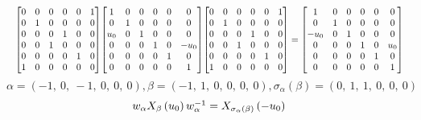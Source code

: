 \documentclass[11pt]{article}
\theoremstyle{definition}
\begin{document}
\[
\scaletoalign{\textwidth}{{\left[\begin{matrix}0 & 0 & 0 & 0 & 0 & 1\\0 & 1 & 0 & 0 & 0 & 0\\0 & 0 & 0 & 1 & 0 & 0\\0 & 0 & 1 & 0 & 0 & 0\\0 & 0 & 0 & 0 & 1 & 0\\1 & 0 & 0 & 0 & 0 & 0\end{matrix}\right]} {\left[\begin{matrix}1 & 0 & 0 & 0 & 0 & 0\\0 & 1 & 0 & 0 & 0 & 0\\u_{0} & 0 & 1 & 0 & 0 & 0\\0 & 0 & 0 & 1 & 0 & - u_{0}\\0 & 0 & 0 & 0 & 1 & 0\\0 & 0 & 0 & 0 & 0 & 1\end{matrix}\right]} {\left[\begin{matrix}0 & 0 & 0 & 0 & 0 & 1\\0 & 1 & 0 & 0 & 0 & 0\\0 & 0 & 0 & 1 & 0 & 0\\0 & 0 & 1 & 0 & 0 & 0\\0 & 0 & 0 & 0 & 1 & 0\\1 & 0 & 0 & 0 & 0 & 0\end{matrix}\right]} = {\left[\begin{matrix}1 & 0 & 0 & 0 & 0 & 0\\0 & 1 & 0 & 0 & 0 & 0\\- u_{0} & 0 & 1 & 0 & 0 & 0\\0 & 0 & 0 & 1 & 0 & u_{0}\\0 & 0 & 0 & 0 & 1 & 0\\0 & 0 & 0 & 0 & 0 & 1\end{matrix}\right]}}
\]
\[
\alpha = \left( -1, \  0, \  -1, \  0, \  0, \  0\right), \beta = \left( -1, \  1, \  0, \  0, \  0, \  0\right), \sigma_{\alpha}(\beta) = \left( 0, \  1, \  1, \  0, \  0, \  0\right)
\]
\[
\scaletoalign{\textwidth}{w_{\alpha} X_{\beta}\left(u_{0}\right) w_{\alpha}^{-1} = X_{\sigma_{\alpha}\left(\beta\right)}\left(- u_{0}\right)}
\]
\end{document}
